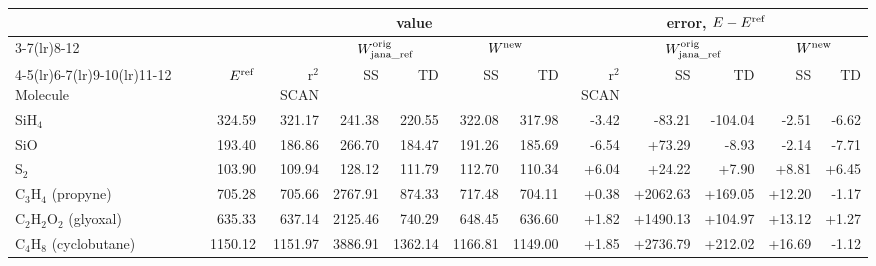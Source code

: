 \begin{tabular}{@{}l r rrrrr rrrrr@{}}
\toprule
 & & \multicolumn{5}{c}{value} & \multicolumn{5}{c}{error, $E-E^{\rm ref}$} \\
\cmidrule(lr){3-7}\cmidrule(lr){8-12}
 & & & \multicolumn{2}{c}{$W^{\rm orig}_{\rm jana\_ref}$} & \multicolumn{2}{c}{$W^{\rm new}$} & & \multicolumn{2}{c}{$W^{\rm orig}_{\rm jana\_ref}$} & \multicolumn{2}{c}{$W^{\rm new}$} \\
\cmidrule(lr){4-5}\cmidrule(lr){6-7}\cmidrule(lr){9-10}\cmidrule(lr){11-12}
Molecule & $E^{\rm ref}$ & r$^2$SCAN & SS & TD & SS & TD & r$^2$SCAN & SS & TD & SS & TD \\
\midrule
SiH$_4$ & 324.59 & \textcolor{pyscfred}{321.17} & \textcolor{pyscfred}{241.38} & \textcolor{pyscfred}{220.55} & \textcolor{pyscfred}{322.08} & \textcolor{pyscfred}{317.98} & \textcolor{pyscfred}{-3.42} & \textcolor{pyscfred}{-83.21} & \textcolor{pyscfred}{-104.04} & \textcolor{pyscfred}{-2.51} & \textcolor{pyscfred}{-6.62} \\
SiO & 193.40 & \textcolor{pyscfred}{186.86} & \textcolor{pyscfred}{266.70} & \textcolor{pyscfred}{184.47} & \textcolor{pyscfred}{191.26} & \textcolor{pyscfred}{185.69} & \textcolor{pyscfred}{-6.54} & \textcolor{pyscfred}{+73.29} & \textcolor{pyscfred}{-8.93} & \textcolor{pyscfred}{-2.14} & \textcolor{pyscfred}{-7.71} \\
S$_2$ & 103.90 & \textcolor{pyscfred}{109.94} & \textcolor{pyscfred}{128.12} & \textcolor{pyscfred}{111.79} & \textcolor{pyscfred}{112.70} & \textcolor{pyscfred}{110.34} & \textcolor{pyscfred}{+6.04} & \textcolor{pyscfred}{+24.22} & \textcolor{pyscfred}{+7.90} & \textcolor{pyscfred}{+8.81} & \textcolor{pyscfred}{+6.45} \\
C$_3$H$_4$ (propyne) & 705.28 & \textcolor{pyscfred}{705.66} & \textcolor{pyscfred}{2767.91} & \textcolor{pyscfred}{874.33} & \textcolor{pyscfred}{717.48} & \textcolor{pyscfred}{704.11} & \textcolor{pyscfred}{+0.38} & \textcolor{pyscfred}{+2062.63} & \textcolor{pyscfred}{+169.05} & \textcolor{pyscfred}{+12.20} & \textcolor{pyscfred}{-1.17} \\
C$_2$H$_2$O$_2$ (glyoxal) & 635.33 & \textcolor{pyscfred}{637.14} & \textcolor{pyscfred}{2125.46} & \textcolor{pyscfred}{740.29} & \textcolor{pyscfred}{648.45} & \textcolor{pyscfred}{636.60} & \textcolor{pyscfred}{+1.82} & \textcolor{pyscfred}{+1490.13} & \textcolor{pyscfred}{+104.97} & \textcolor{pyscfred}{+13.12} & \textcolor{pyscfred}{+1.27} \\
C$_4$H$_8$ (cyclobutane) & 1150.12 & \textcolor{pyscfred}{1151.97} & \textcolor{pyscfred}{3886.91} & \textcolor{pyscfred}{1362.14} & \textcolor{pyscfred}{1166.81} & \textcolor{pyscfred}{1149.00} & \textcolor{pyscfred}{+1.85} & \textcolor{pyscfred}{+2736.79} & \textcolor{pyscfred}{+212.02} & \textcolor{pyscfred}{+16.69} & \textcolor{pyscfred}{-1.12} \\

\end{tabular}
